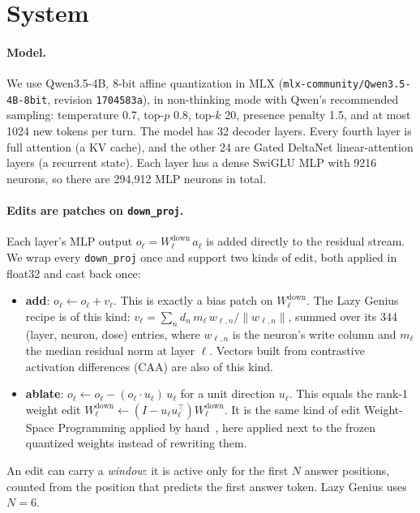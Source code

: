 \section{System}
\label{sec:system}

\paragraph{Model.} We use Qwen3.5-4B, 8-bit affine quantization in MLX (\texttt{mlx-community/Qwen3.5-4B-8bit}, revision \texttt{1704583a}), in non-thinking mode with Qwen's recommended sampling: temperature 0.7, top-$p$ 0.8, top-$k$ 20, presence penalty 1.5, and at most 1024 new tokens per turn. The model has 32 decoder layers. Every fourth layer is full attention (a KV cache), and the other 24 are Gated DeltaNet linear-attention layers (a recurrent state). Each layer has a dense SwiGLU MLP with 9216 neurons, so there are 294{,}912 MLP neurons in total.

\paragraph{Edits are patches on \texttt{down\_proj}.} Each layer's MLP output $o_\ell = W^{\text{down}}_\ell\, a_\ell$ is added directly to the residual stream. We wrap every \texttt{down\_proj} once and support two kinds of edit, both applied in float32 and cast back once:
\begin{itemize}
\item \textbf{add}: $o_\ell \leftarrow o_\ell + v_\ell$. This is exactly a bias patch on $W^{\text{down}}_\ell$. The Lazy Genius recipe is of this kind: $v_\ell=\sum_n d_n\, m_\ell\, w_{\ell,n}/\lVert w_{\ell,n}\rVert$, summed over its 344 (layer, neuron, dose) entries, where $w_{\ell,n}$ is the neuron's write column and $m_\ell$ the median residual norm at layer $\ell$. Vectors built from contrastive activation differences (CAA) are also of this kind.
\item \textbf{ablate}: $o_\ell \leftarrow o_\ell - (o_\ell\!\cdot\! u_\ell)\,u_\ell$ for a unit direction $u_\ell$. This equals the rank-1 weight edit $W^{\text{down}}_\ell \leftarrow (I-u_\ell u_\ell^\top)W^{\text{down}}_\ell$. It is the same kind of edit Weight-Space Programming applied by hand~\cite{takehi2026wsp}, here applied next to the frozen quantized weights instead of rewriting them.
\end{itemize}
An edit can carry a \emph{window}: it is active only for the first $N$ answer positions, counted from the position that predicts the first answer token. Lazy Genius uses $N{=}6$.


